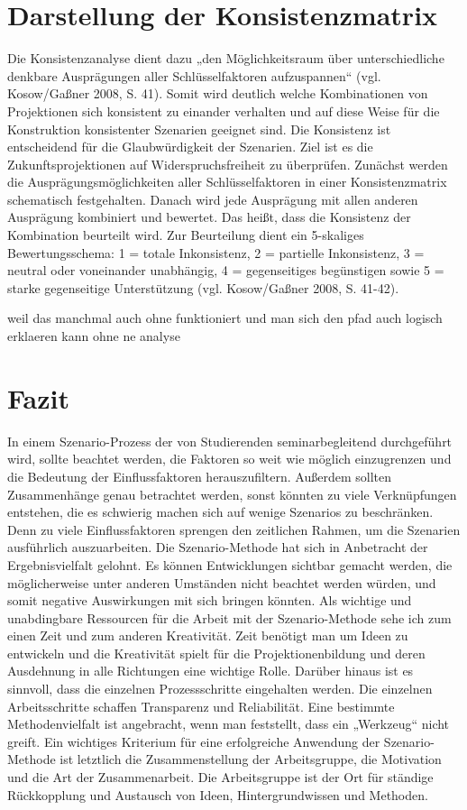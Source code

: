 \documentclass[12pt,a4paper]{article}
\begin{document}
\section{Darstellung der Konsistenzmatrix}
Die Konsistenzanalyse dient dazu „den Möglichkeitsraum über unterschiedliche denkbare Ausprägungen aller Schlüsselfaktoren aufzuspannen“ (vgl. Kosow/Gaßner 2008, S. 41)\cite{Kosow2008}. Somit wird deutlich welche Kombinationen von Projektionen sich konsistent zu einander verhalten und auf diese Weise für die Konstruktion konsistenter Szenarien geeignet sind. Die Konsistenz ist entscheidend für die Glaubwürdigkeit der Szenarien. Ziel ist es die Zukunftsprojektionen auf Widerspruchsfreiheit zu überprüfen. Zunächst werden die Ausprägungsmöglichkeiten aller Schlüsselfaktoren in einer Konsistenzmatrix schematisch festgehalten. Danach wird jede Ausprägung mit allen anderen Ausprägung kombiniert und bewertet. Das heißt, dass die Konsistenz der Kombination beurteilt wird. Zur Beurteilung dient ein 5-skaliges Bewertungsschema: 1 = totale Inkonsistenz, 2 = partielle Inkonsistenz, 3 = neutral oder voneinander unabhängig, 4 = gegenseitiges begünstigen sowie 5 = starke gegenseitige Unterstützung (vgl. Kosow/Gaßner 2008, S. 41-42). 

weil das manchmal auch ohne funktioniert und man sich den pfad auch logisch erklaeren kann ohne ne analyse 


\section{Fazit}
In einem Szenario-Prozess der von Studierenden seminarbegleitend durchgeführt wird, sollte beachtet werden, die Faktoren so weit wie möglich einzugrenzen und die Bedeutung der Einflussfaktoren herauszufiltern. Außerdem sollten Zusammenhänge genau betrachtet werden, sonst könnten zu viele Verknüpfungen entstehen, die es schwierig machen sich auf wenige Szenarios zu beschränken. Denn zu viele Einflussfaktoren sprengen den zeitlichen Rahmen, um die Szenarien ausführlich auszuarbeiten. 
Die Szenario-Methode hat sich in Anbetracht der Ergebnisvielfalt gelohnt. Es können Entwicklungen sichtbar gemacht werden, die möglicherweise unter anderen Umständen nicht beachtet werden würden, und somit negative Auswirkungen mit sich bringen könnten. 
Als wichtige und unabdingbare Ressourcen für die Arbeit mit der Szenario-Methode sehe ich zum einen Zeit und zum anderen Kreativität. Zeit benötigt man um Ideen zu entwickeln und die Kreativität spielt für die Projektionenbildung und deren Ausdehnung in alle Richtungen eine wichtige Rolle. Darüber hinaus ist es sinnvoll, dass die einzelnen Prozessschritte eingehalten werden. Die einzelnen Arbeitsschritte schaffen Transparenz und Reliabilität. Eine bestimmte Methodenvielfalt ist angebracht, wenn man feststellt, dass ein „Werkzeug“ nicht greift. 
Ein wichtiges Kriterium für eine erfolgreiche Anwendung der Szenario-Methode ist letztlich die Zusammenstellung der Arbeitsgruppe, die Motivation und die Art der Zusammenarbeit. Die Arbeitsgruppe ist der Ort für ständige Rückkopplung und Austausch von Ideen, Hintergrundwissen und Methoden.
\end{document}
